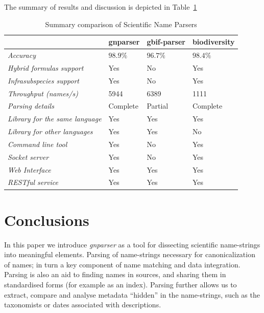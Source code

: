 \documentclass{bmcart}
\begin{document}
The summary of results and discussion is depicted in
Table~\ref{table:summary}

\begin{table}[htb]
  \begin{center}
    \caption{Summary comparison of Scientific Name Parsers}
    \label{table:summary}
    \resizebox{12.5cm}{!} {
    \begin{tabular}{|l|*{3}{l}|}
      \hline
                             & gnparser & gbif-parser & biodiversity \\
      \hline
      \textit{Accuracy}                     & $98.9\%$ & $96.7\%$ & $98.4\%$\\
      \textit{Hybrid formulas support}      & Yes      & No       & Yes     \\
      \textit{Infrasubspecies support}      & Yes      & No       & Yes     \\
      \textit{Throughput (names/s)}         & 5944     & 6389     & 1111    \\
      \textit{Parsing details}              & Complete & Partial  & Complete\\
      \textit{Library for the same language}& Yes      & Yes      & Yes     \\
      \textit{Library for other languages}  & Yes      & Yes      & No      \\
      \textit{Command line tool}            & Yes      & No       & Yes     \\
      \textit{Socket server}                & Yes      & No       & Yes     \\
      \textit{Web Interface}                & Yes      & Yes      & Yes     \\
      \textit{RESTful service}              & Yes      & Yes      & Yes     \\
      \hline
    \end{tabular}
  }
  \end{center}
\end{table}

\section*{Conclusions}

In this paper we introduce \textit{gnparser} as a tool for dissecting
scientific name-strings into meaningful elements. Parsing of name-strings necessary for canonicalization of names; in turn a key component of name matching and data integration. Parsing is  also an aid to finding names in sources, and sharing them in standardised
forms (for example as an index). Parsing further allows us to extract, compare and analyse metadata
``hidden'' in the name-strings, such as the  taxonomists or dates associated
with descriptions.
\end{document}
